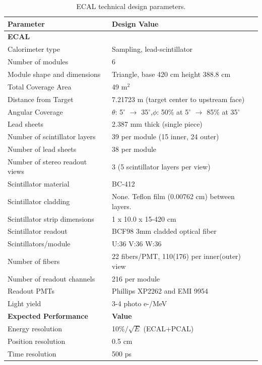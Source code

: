 \documentclass[letterpaper,10pt]{article}
\begin{document}
\begin{table}[htbp]
\begin{center}
\begin{tabular}{|l|l|} \hline
{\bf Parameter}        & {\bf Design Value} \\ \hline \hline
{\bf ECAL}         &              \\ \hline
Calorimeter type   & Sampling, lead-scintillator \\ \hline
Number of modules  & 6 \\ \hline
Module shape and dimensions & Triangle, base 420 cm height 388.8 cm \\ \hline
Total Coverage Area      & 49 m$^2$ \\ \hline
Distance from Target & 7.21723 m (target center to upstream face) \\ \hline
Angular Coverage   & $\theta$: 5$^\circ$ $\to$ 35$^\circ$,$\phi$: 50\% at 5$^\circ$ $\to$ 85\% at 35$^\circ$ \\ \hline
Lead sheets & 2.387 mm thick (single piece)\\ \hline
Number of scintillator layers & 39 per module (15 inner, 24 outer) \\ \hline
Number of lead sheets  & 38 per module \\ \hline
Number of stereo readout views & 3 (5 scintillator layers per view) \\ \hline
Scintillator material & BC-412\\ \hline
Scintillator cladding & None. Teflon film (0.00762 cm) between layers. \\ \hline
Scintillator strip dimensions & 1 x 10.0 x 15-420 cm \\ \hline
Scintillator readout & BCF98 3mm cladded optical fiber \\ \hline
Scintillators/module & U:36 V:36 W:36 \\ \hline
Number of fibers & 22 fibers/PMT, 110(176) per inner(outer) view \\ \hline
Number of readout channels & 216 per module \\ \hline
Readout PMTs & Phillips XP2262 and EMI 9954 \\ \hline
Light yield & 3-4 photo e-/MeV \\ \hline \hline
{\bf Expected Performance} & {\bf Value} \\ \hline
Energy resolution & 10$\%/\sqrt E$ (ECAL+PCAL) \\ \hline
Position resolution & 0.5 cm \\ \hline
Time resolution & 500 ps \\ \hline

\end{tabular}
\end{center}
\caption{ECAL technical design parameters.} 
\label{tab:ftofproperties}
\end{table}
\end{document}

